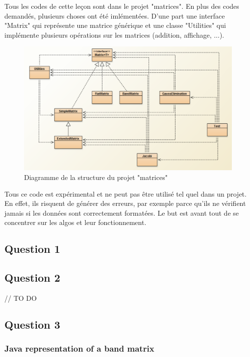 Tous les codes de cette leçon sont dans le projet "matrices". En plus des codes demandés, plusieurs choses ont été imlémentées. D'une part une interface "Matrix" qui représente une matrice générique et une classe "Utilities" qui implémente plusieurs opérations sur les matrices (addition, affichage, ...).

\begin{figure}[H]
	\caption{\label{struc} Diagramme de la structure du projet "matrices"}
	\centering
	\includegraphics[scale = 0.6]{2_structure.png}
\end{figure}

Tous ce code est expérimental et ne peut pas être utilisé tel quel dans un projet. En effet, ils risquent de générer des erreurs, par exemple parce qu'ils ne vérifient jamais si les données sont correctement formatées. Le but est avant tout de se concentrer sur les algos et leur fonctionnement.

\subsection{Question 1}

\subsection{Question 2}

// TO DO

\subsection{Question 3}

\subsubsection{Java representation of a band matrix}

